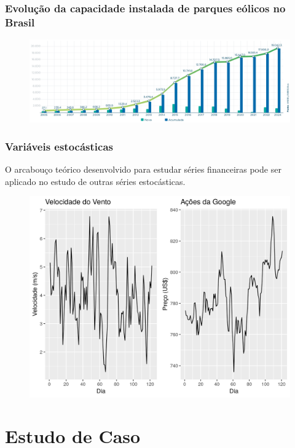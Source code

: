 \documentclass[mathserif,serif]{beamer}
\begin{document}
\begin{frame}
	\frametitle{Evolução da capacidade instalada de parques eólicos no Brasil}
	\begin{figure}
		\centering
		\includegraphics[width=\textwidth]{abe_evolucao_capacidade_instalada}
	\end{figure}
\end{frame}



\begin{frame}
	\frametitle{Variáveis estocásticas}

	O arcabouço teórico desenvolvido para estudar séries financeiras pode ser aplicado no estudo de outras séries estocásticas.

	\begin{figure}
		\centering
		\includegraphics[scale=0.5]{wind_money}
	\end{figure}
\end{frame}

\section{Estudo de Caso}
\end{document}
